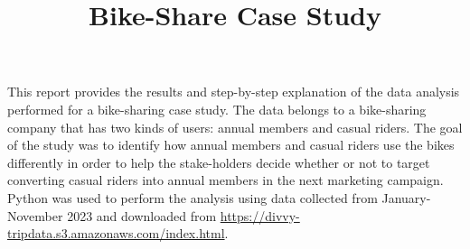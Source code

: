 \documentclass[12pt]{article}
\begin{document}
\title{Bike-Share Case Study}
\date{}
\maketitle

This report provides the results and step-by-step explanation of the data analysis performed for a bike-sharing case study. The data belongs to a bike-sharing company that has two kinds of users: annual members and casual riders. The goal of the study was to identify how annual members and casual riders use the bikes differently in order to help the stake-holders decide whether or not to target converting casual riders into annual members in the next marketing campaign. Python was used to perform the analysis using data collected from January-November 2023 and downloaded from \url{https://divvy-tripdata.s3.amazonaws.com/index.html}.
\end{document}
